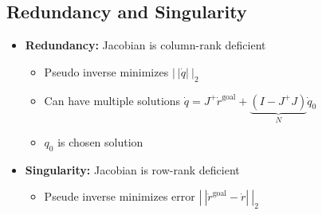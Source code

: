 \documentclass[a4paper]{article}
\newcommand{\ides}[1]{\item \textbf{#1}}
\newcommand{\norm}[1]{\left| \!\:\! \left| #1 \right| \!\:\! \right|}
\begin{document}
\subsection{Redundancy and Singularity}
\begin{itemize}
    \ides{Redundancy:} Jacobian is column-rank deficient
        \begin{itemize}
            \item Pseudo inverse minimizes $\norm{\dot q}_2$
            \item Can have multiple solutions $\dot q = J^+ \dot r^\text{goal} + \underbrace{(I - J^+ J)}_{N} \dot q_0$
            \item $q_0$ is chosen solution
        \end{itemize}
    \ides{Singularity:} Jacobian is row-rank deficient
        \begin{itemize}
            \item Pseude inverse minimizes error $\norm{\dot r^\text{goal} - \dot r}_2$
        \end{itemize}
\end{itemize}
\end{document}
